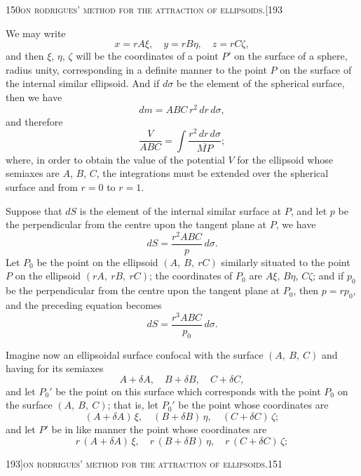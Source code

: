 \documentclass[11pt]{article}
\begin{document}
\newpage

\begin{center}
\small 150\hfill\textsc{on rodrigues' method for the attraction of ellipsoids.}\hfill[193
\end{center}

\medskip

\noindent We may write
\[
x = r A\xi,\quad y = r B\eta,\quad z = r C\zeta,
\]
and then $\xi$, $\eta$, $\zeta$ will be the coordinates of a point $P'$ on the surface of a sphere, radius unity, corresponding in a definite manner to the point $P$ on the surface of the internal similar ellipsoid. And if $d\sigma$ be the element of the spherical surface, then we have
\[
d m = A B C\,r^{2}\,dr\,d\sigma,
\]
and therefore
\[
\frac{V}{A B C} = \int\frac{r^{2}\,dr\,d\sigma}{\overline{MP}};
\]
where, in order to obtain the value of the potential $V$ for the ellipsoid whose semiaxes are $A$, $B$, $C$, the integrations must be extended over the spherical surface and from $r = 0$ to $r = 1$.

Suppose that $dS$ is the element of the internal similar surface at $P$, and let $p$ be the perpendicular from the centre upon the tangent plane at $P$, we have
\[
dS = \frac{r^{2} A B C}{p}\,d\sigma.
\]
Let $P_{0}$ be the point on the ellipsoid $(A,\ B,\ rC)$ similarly situated to the point $P$ on the ellipsoid $(r A,\ r B,\ r C)$; the coordinates of $P_{0}$ are $A\xi$, $B\eta$, $C\zeta$; and if $p_{0}$ be the perpendicular from the centre upon the tangent plane at $P_{0}$, then $p = r p_{0}$, and the preceding equation becomes
\[
dS = \frac{r^{3} A B C}{p_{0}}\,d\sigma.
\]

Imagine now an ellipsoidal surface confocal with the surface $(A,\ B,\ C)$ and having for its semiaxes
\[
A + \delta A,\quad B + \delta B,\quad C + \delta C,
\]
and let $P_{0}'$ be the point on this surface which corresponds with the point $P_{0}$ on the surface $(A,\ B,\ C)$; that is, let $P_{0}'$ be the point whose coordinates are
\[
(A + \delta A)\,\xi,\quad (B + \delta B)\,\eta,\quad (C + \delta C)\,\zeta;
\]
and let $P'$ be in like manner the point whose coordinates are
\[
r\,(A + \delta A)\,\xi,\quad r\,(B + \delta B)\,\eta,\quad r\,(C + \delta C)\,\zeta;
\]

\newpage

\begin{center}
\small 193]\hfill\textsc{on rodrigues' method for the attraction of ellipsoids.}\hfill\textsc{151}
\end{center}
\end{document}
